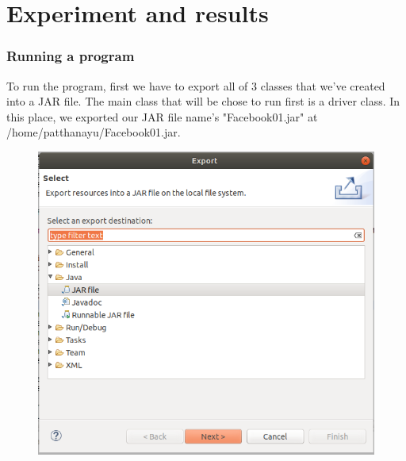 \documentclass[11pt]{article}
\begin{document}
\newpage
\section{Experiment and results}\label{sec:exp}
\subsubsection*{Running a program}
To run the program, first we have to export all of 3 classes that we've created into a JAR file. The main class that will be chose to run first is a driver class. In this place, we exported our JAR file name's "Facebook01.jar" at /home/patthanayu/Facebook01.jar. 

\begin{figure}[h]
\centering
\includegraphics[scale=0.45]{res}

\end{figure}
\end{document}
